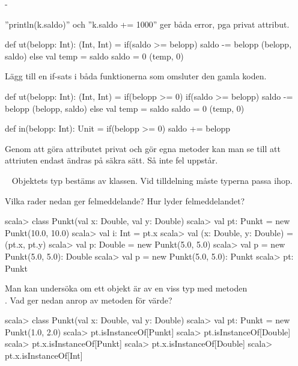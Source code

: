 \SubtaskSolved  -

\SubtaskSolved 
''println(k.saldo)'' och ''k.saldo += 1000'' ger båda error, pga privat attribut.

\SubtaskSolved 
\begin{Code}
def ut(belopp: Int): (Int, Int) = {
	if(saldo >= belopp) {
		saldo -= belopp
		(belopp, saldo)
	} else {
		val temp = saldo
		saldo = 0
		(temp, 0)
	}
}
\end{Code}

\SubtaskSolved 
Lägg till en if-sats i båda funktionerna som omsluter den gamla koden.
\begin{Code}
def ut(belopp: Int): (Int, Int) = {
  if(belopp >= 0) {
    if(saldo >= belopp) {
      saldo -= belopp
      (belopp, saldo)
    } else {
      val temp = saldo
      saldo = 0
      (temp, 0)
    }
  }
}

def in(belopp: Int): Unit = {
  if(belopp >= 0) {
    saldo += belopp
  }
}
\end{Code}

\SubtaskSolved 
Genom att göra attributet privat och gör egna metoder kan man se till att attriuten endast ändras på säkra sätt. Så inte fel uppstår.


\QUESTEND









\QUESTBEGIN

\Task  \what~  Objektets typ bestäms av klassen. Vid tilldelning måste typerna passa ihop.

\Subtask Vilka rader nedan ger felmeddelande? Hur lyder felmeddelandet?
\begin{REPL}
scala> class Punkt(val x: Double, val y: Double)
scala> val pt: Punkt = new Punkt(10.0, 10.0)
scala> val i: Int = pt.x
scala> val (x: Double, y: Double) = (pt.x, pt.y)
scala> val p: Double = new Punkt(5.0, 5.0)
scala> val p = new Punkt(5.0, 5.0): Double
scala> val p = new Punkt(5.0, 5.0): Punkt
scala> pt: Punkt
\end{REPL}


\Subtask Man kan undersöka om ett objekt är av en viss typ med metoden \\ . Vad ger nedan anrop av metoden  för värde?
\begin{REPL}
scala> class Punkt(val x: Double, val y: Double)
scala> val pt: Punkt = new Punkt(1.0, 2.0)
scala> pt.isInstanceOf[Punkt]
scala> pt.isInstanceOf[Double]
scala> pt.x.isInstanceOf[Punkt]
scala> pt.x.isInstanceOf[Double]
scala> pt.x.isInstanceOf[Int]
\end{REPL}

